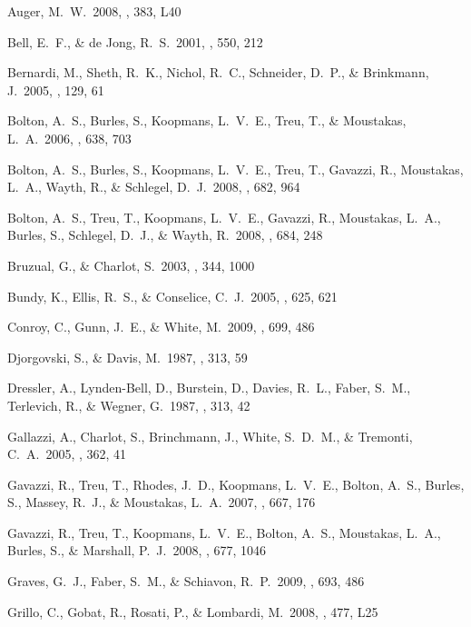  Auger, M.~W.\ 2008, \mnras, 383, L40 

 Bell, E.~F., \& de Jong, R.~S.\ 2001, \apj, 550, 212 

 Bernardi, M., Sheth, R.~K., Nichol, R.~C., Schneider, D.~P., \& Brinkmann, J.\ 2005, \aj, 129, 61 

 Bolton, A.~S., Burles, S., Koopmans, L.~V.~E., Treu, T., \& Moustakas, L.~A.\ 2006, \apj, 638, 703

 Bolton, A.~S., Burles, S., Koopmans, L.~V.~E., Treu, T., Gavazzi, R., Moustakas, L.~A., Wayth, R., \& Schlegel, D.~J.\ 2008, \apj, 682, 964 

 Bolton, A.~S., Treu, T., Koopmans, L.~V.~E., Gavazzi, R., Moustakas, L.~A., Burles, S., Schlegel, D.~J., \& Wayth, R.\ 2008, \apj, 684, 248 

 Bruzual, G., \& Charlot, S.\ 2003, \mnras, 344, 1000 

 Bundy, K., Ellis, R.~S., \& Conselice, C.~J.\ 2005, \apj, 625, 621 

 Conroy, C., Gunn, J.~E., \& White, M.\ 2009, \apj, 699, 486 

 Djorgovski, S., \& Davis, M.\ 1987, \apj, 313, 59 

 Dressler, A., Lynden-Bell, D., Burstein, D., Davies, R.~L., Faber, S.~M., Terlevich, R., \& Wegner, G.\ 1987, \apj, 313, 42

 Gallazzi, A., Charlot, S., Brinchmann, J., White, S.~D.~M., \& Tremonti, C.~A.\ 2005, \mnras, 362, 41

 Gavazzi, R., Treu, T., Rhodes, J.~D., Koopmans, L.~V.~E., Bolton, A.~S., Burles, S., Massey, R.~J., \& Moustakas, L.~A.\ 2007, \apj, 667, 176 

 Gavazzi, R., Treu, T., Koopmans, L.~V.~E., Bolton, A.~S., Moustakas, L.~A., Burles, S., \& Marshall, P.~J.\ 2008, \apj, 677, 1046 

 Graves, G.~J., Faber, S.~M., \& Schiavon, R.~P.\ 2009, \apj, 693, 486  

 Grillo, C., Gobat, R., Rosati, P., \& Lombardi, M.\ 2008, \aap, 477, L25 

